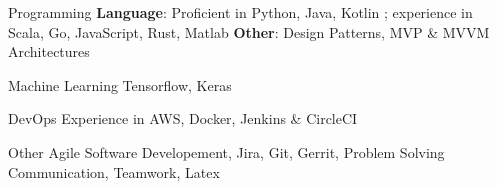 

\begin{cvskills}

  \cvskill
    {Programming} %
    {\textbf{Language}: Proficient in Python, Java, Kotlin ; experience in Scala, Go, JavaScript, Rust, Matlab \linebreak \textbf{Other}: Design Patterns, MVP \& MVVM Architectures} %


  \cvskill
    {Machine Learning} %
  { Tensorflow, Keras} %

  \cvskill
    {DevOps} %
    {Experience in AWS, Docker, Jenkins \& CircleCI} %


  \cvskill
    {Other} %
    { Agile Software Developement, Jira, Git, Gerrit, Problem Solving Communication, Teamwork, Latex} %


\end{cvskills}